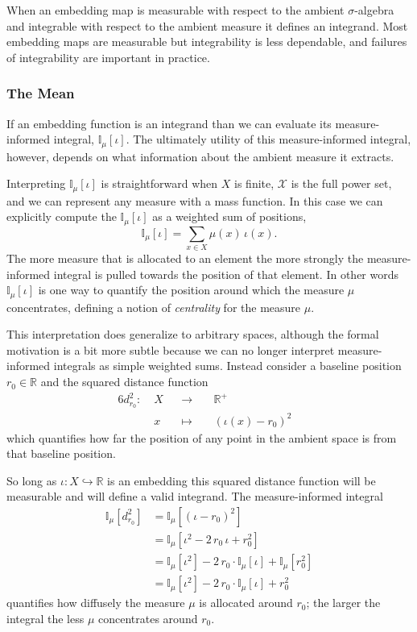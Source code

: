 \documentclass[
  letterpaper,
  DIV=11,
  numbers=noendperiod]{scrartcl}
\begin{document}
When an embedding map is measurable with respect to the ambient
\(\sigma\)-algebra and integrable with respect to the ambient measure it
defines an integrand. Most embedding maps are measurable but
integrability is less dependable, and failures of integrability are
important in practice.

\hypertarget{the-mean}{%
\subsubsection{The Mean}\label{the-mean}}

If an embedding function is an integrand than we can evaluate its
measure-informed integral, \(\mathbb{I}_{\mu}[\iota]\). The ultimately
utility of this measure-informed integral, however, depends on what
information about the ambient measure it extracts.

Interpreting \(\mathbb{I}_{\mu}[\iota]\) is straightforward when \(X\)
is finite, \(\mathcal{X}\) is the full power set, and we can represent
any measure with a mass function. In this case we can explicitly compute
the \(\mathbb{I}_{\mu}[\iota]\) as a weighted sum of positions, \[
\mathbb{I}_{\mu}[\iota] = \sum_{x \in X} \mu(x) \, \iota(x).
\] The more measure that is allocated to an element the more strongly
the measure-informed integral is pulled towards the position of that
element. In other words \(\mathbb{I}_{\mu}[\iota]\) is one way to
quantify the position around which the measure \(\mu\) concentrates,
defining a notion of \emph{centrality} for the measure \(\mu\).

This interpretation does generalize to arbitrary spaces, although the
formal motivation is a bit more subtle because we can no longer
interpret measure-informed integrals as simple weighted sums. Instead
consider a baseline position \(r_{0} \in \mathbb{R}\) and the squared
distance function \begin{alignat*}{6}
d_{r_{0}}^{2} :\; & X & &\rightarrow& \; &\mathbb{R}^{+}&
\\
& x & &\mapsto& & (\iota(x) - r_{0})^{2} &
\end{alignat*} which quantifies how far the position of any point in the
ambient space is from that baseline position.

So long as \(\iota : X \hookrightarrow \mathbb{R}\) is an embedding this
squared distance function will be measurable and will define a valid
integrand. The measure-informed integral \begin{align*}
\mathbb{I}_{\mu} \left[ d_{r_{0}}^{2} \right]
&=
\mathbb{I}_{\mu} \left[ (\iota - r_{0})^{2} \right]
\\
&=
\mathbb{I}_{\mu} \left[ \iota^{2} - 2 \, r_{0} \, \iota + r_{0}^{2} \right]
\\
&=
\mathbb{I}_{\mu} \left[ \iota^{2} \right]
-2 \, r_{0} \cdot \mathbb{I}_{\mu} \left[ \iota \right]
+ \mathbb{I}_{\mu} \left[ r_{0}^{2} \right]
\\
&=
\mathbb{I}_{\mu} \left[ \iota^{2} \right]
-2 \, r_{0} \cdot \mathbb{I}_{\mu} \left[ \iota \right]
+ r_{0}^{2}
\end{align*} quantifies how diffusely the measure \(\mu\) is allocated
around \(r_{0}\); the larger the integral the less \(\mu\) concentrates
around \(r_{0}\).
\end{document}
